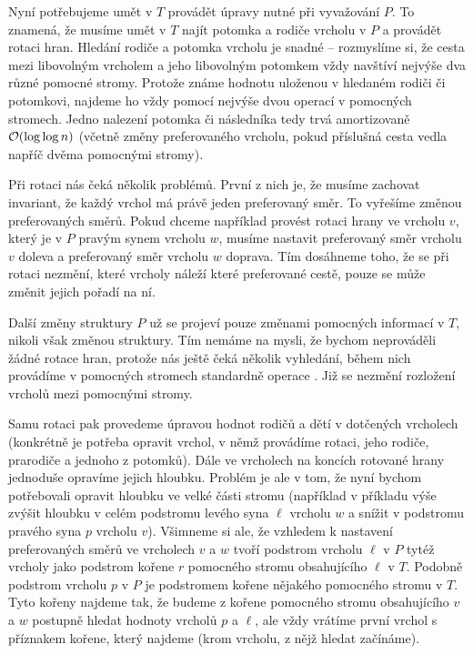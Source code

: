Nyní potřebujeme umět v $T$ provádět úpravy nutné při vyvažování $P$. To
znamená, že musíme umět v $T$ najít potomka a rodiče vrcholu v $P$ a provádět
rotaci hran. Hledání rodiče a potomka vrcholu je snadné -- rozmyslíme si, že
cesta mezi libovolným vrcholem a jeho libovolným potomkem vždy navštíví nejvýše
dva různé pomocné stromy. Protože známe hodnotu uloženou v hledaném rodiči či
potomkovi, najdeme ho vždy pomocí nejvýše dvou operací  v pomocných
stromech. Jedno nalezení potomka či následníka tedy trvá amortizovaně
$\mathcal O(\log\log n)$ (včetně změny preferovaného vrcholu, pokud příslušná cesta
vedla napříč dvěma pomocnými stromy).

Při rotaci nás čeká několik problémů. První z nich je, že musíme zachovat
invariant, že každý vrchol má právě jeden preferovaný směr. To vyřešíme změnou
preferovaných směrů. Pokud chceme například provést rotaci hrany ve vrcholu
$v$, který je v $P$ pravým synem vrcholu $w$, musíme nastavit preferovaný směr
vrcholu $v$ doleva a preferovaný směr vrcholu $w$ doprava. Tím dosáhneme toho,
že se při rotaci nezmění, které vrcholy náleží které preferované cestě, pouze
se může změnit jejich pořadí na ní.

Další změny struktury $P$ už se projeví pouze změnami pomocných informací v
$T$, nikoli však změnou struktury. Tím nemáme na mysli, že bychom neprováděli
žádné rotace hran, protože nás ještě čeká několik vyhledání, během nich
provádíme v pomocných stromech standardně operace . Již se nezmění
rozložení vrcholů mezi pomocnými stromy.

Samu rotaci pak provedeme úpravou hodnot rodičů a dětí v dotčených vrcholech
(konkrétně je potřeba opravit vrchol, v němž provádíme rotaci, jeho rodiče,
prarodiče a jednoho z potomků). Dále ve vrcholech na koncích rotované hrany
jednoduše opravíme jejich hloubku. Problém je ale v tom, že nyní bychom
potřebovali opravit hloubku ve velké části stromu (například v příkladu výše
zvýšit hloubku v celém podstromu levého syna $\ell$ vrcholu $w$ a snížit v
podstromu pravého syna $p$ vrcholu $v$). Všimneme si ale, že vzhledem k
nastavení preferovaných směrů ve vrcholech $v$ a $w$ tvoří podstrom vrcholu
$\ell$ v $P$ tytéž vrcholy jako podstrom kořene $r$ pomocného stromu
obsahujícího $\ell$ v $T$. Podobně podstrom vrcholu $p$ v $P$ je podstromem
kořene nějakého pomocného stromu v $T$. Tyto kořeny najdeme tak, že budeme z
kořene pomocného stromu obsahujícího $v$ a $w$ postupně hledat hodnoty
vrcholů $p$ a $\ell$, ale vždy vrátíme první vrchol s příznakem kořene, který
najdeme (krom vrcholu, z nějž hledat začínáme).

